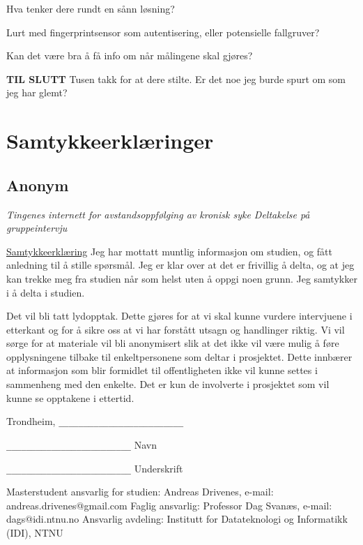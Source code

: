 Hva tenker dere rundt en sånn løsning?
 
Lurt med fingerprintsensor som autentisering, eller potensielle fallgruver? 
 
Kan det være bra å få info om når målingene skal gjøres?
 
\textbf{TIL SLUTT}
Tusen takk for at dere stilte.
Er det noe jeg burde spurt om som jeg har glemt?


\chapter{Samtykkeerklæringer}
\label{appendix:samtykke}

\section{Anonym}
\begin{center} \textit{Tingenes internett for avstandsoppfølging av kronisk syke \newline
Deltakelse på gruppeintervju}
\end{center}
\underline{Samtykkeerklæring} \newline
Jeg har mottatt muntlig informasjon om studien, og fått anledning til å stille spørsmål. Jeg er klar over at det er frivillig
å delta, og at jeg kan trekke meg fra studien når som helst uten å oppgi noen grunn. Jeg samtykker i å delta i studien.

Det vil bli tatt lydopptak.  Dette gjøres for at vi skal kunne vurdere intervjuene i etterkant og for å sikre oss at
vi har forstått utsagn og handlinger riktig. Vi vil sørge for at materiale vil bli anonymisert slik at det ikke vil
være mulig å føre opplysningene tilbake til enkeltpersonene som deltar i prosjektet. Dette innbærer at informasjon som
blir formidlet til offentligheten ikke vil kunne settes i sammenheng med den enkelte. Det er kun de involverte i prosjektet
som vil kunne se opptakene i ettertid.

Trondheim, \verb|_________________________|

\verb|_________________________|\newline
Navn

\verb|_________________________|\newline
Underskrift \newline

Masterstudent ansvarlig for studien: \newline
	Andreas Drivenes, e-mail: andreas.drivenes@gmail.com \newline
Faglig ansvarlig: \newline
	Professor Dag Svanæs, e-mail: dags@idi.ntnu.no \newline
Ansvarlig avdeling: \newline
	Institutt for Datateknologi og Informatikk (IDI), NTNU

